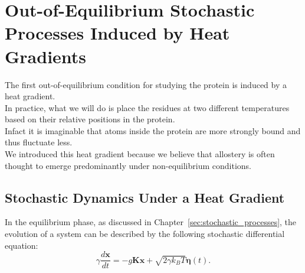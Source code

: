 \documentclass[English, Lau, oneside]{sapthesis}
\begin{document}
\newpage
\chapter{Out-of-Equilibrium Stochastic Processes Induced by Heat Gradients}
\noindent The first out-of-equilibrium condition for studying the protein is induced by a heat gradient.\\
In practice, what we will do is place the residues at two different temperatures based on their relative positions in the protein.\\
Infact it is imaginable that atoms inside the protein are more strongly bound and thus fluctuate less.\\
We introduced this heat gradient because we believe that allostery is often thought to emerge predominantly under non-equilibrium conditions.\\


\newpage
\section{Stochastic Dynamics Under a Heat Gradient}
\noindent In the equilibrium phase, as discussed in Chapter~\ref{sec:stochastic_processes}, the evolution of a system can be described by the following stochastic differential equation:
\begin{equation}
    \gamma \frac{d\mathbf{x}}{dt} = - g \mathbf{K} \mathbf{x} + \sqrt{2 \gamma k_B T} \boldsymbol{\eta}(t).
\end{equation}
\end{document}
